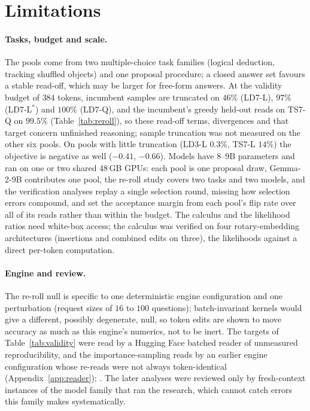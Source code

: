 \section{Limitations}
\label{sec:limitations}

\paragraph{Tasks, budget and scale.} The pools come from two multiple-choice task families (logical
deduction, tracking shuffled objects) and one proposal procedure; a closed answer set favours a
stable read-off, which may be larger for free-form answers. At the validity budget of $384$ tokens,
incumbent samples are truncated on $46\%$ (LD7-L), $97\%$ (LD7-L$^\ast$) and $100\%$ (LD7-Q), and the
incumbent's greedy held-out reads on TS7-Q on $99.5\%$ (Table~\ref{tab:reroll}), so these read-off
terms, divergences and that target concern unfinished reasoning; sample truncation was not measured
on the other six pools. On pools with little truncation (LD3-L $0.3\%$, TS7-L $14\%$) the objective
is negative as well ($-0.41$, $-0.66$). Models have 8--9B parameters and ran on one or two shared
48\,GB GPUs: each pool is one proposal draw, Gemma-2-9B contributes one pool, the re-roll study
covers two tasks and two models, and the verification analyses replay a single selection round,
missing how selection errors compound, and set the acceptance margin from each pool's flip rate over
all of its reads rather than within the budget. The calculus and the likelihood ratios need white-box access; the
calculus was verified on four rotary-embedding architectures (insertions and combined edits on
three), the likelihoods against a direct per-token computation.

\paragraph{Engine and review.} The re-roll null is specific to one deterministic engine
configuration and one perturbation (request sizes of $16$ to $100$ questions); batch-invariant
kernels \citep{he2025nondeterminism} would give a different, possibly degenerate, null, so token
edits are shown to move accuracy as much as this engine's numerics, not to be inert. The targets of
Table~\ref{tab:validity} were read by a Hugging Face batched reader of unmeasured reproducibility,
and the importance-sampling reads by an earlier engine configuration whose re-reads were not always
token-identical (Appendix~\ref{app:reader}); . The later analyses were reviewed only by
fresh-context instances of the model family that ran the research, which cannot catch errors this
family makes systematically.
